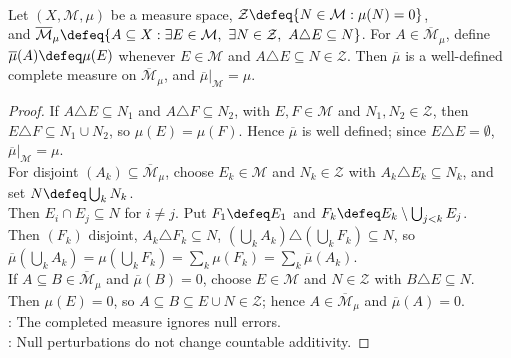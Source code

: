 \begin{proposition} \label{prop:null-ideal-and-measure-completion} \\
Let $(X,\mathcal{M},\mu)$ be a measure space, $\mathcal{Z}\defeq\{N\in\mathcal{M}:\mu(N)=0\}$,\\
and $\overline{\mathcal{M}}_\mu\defeq\{A\subseteq X:\exists E\in\mathcal{M},\ \exists N\in\mathcal{Z},\ A\triangle E\subseteq N\}$. For $A\in\overline{\mathcal{M}}_\mu$, define $\overline{\mu}(A)\defeq\mu(E)$ whenever $E\in\mathcal{M}$ and $A\triangle E\subseteq N\in\mathcal{Z}$. Then $\overline{\mu}$ is a well-defined complete measure on $\overline{\mathcal{M}}_\mu$, and $\overline{\mu}|_{\mathcal{M}}=\mu$.
\begin{proof}
If $A\triangle E\subseteq N_1$ and $A\triangle F\subseteq N_2$, with $E,F\in\mathcal{M}$ and $N_1,N_2\in\mathcal{Z}$, then $E\triangle F\subseteq N_1\cup N_2$, so $\mu(E)=\mu(F)$. Hence $\overline{\mu}$ is well defined; since $E\triangle E=\emptyset$, $\overline{\mu}|_{\mathcal{M}}=\mu$.\\
For disjoint $(A_k)\subseteq\overline{\mathcal{M}}_\mu$, choose $E_k\in\mathcal{M}$ and $N_k\in\mathcal{Z}$ with $A_k\triangle E_k\subseteq N_k$, and set $N\defeq\bigcup_kN_k$.\\
Then $E_i\cap E_j\subseteq N$ for $i\neq j$. Put $F_1\defeq E_1$ and $F_k\defeq E_k\setminus\bigcup_{j<k}E_j$.\\
Then $(F_k)$ disjoint, $A_k\triangle F_k\subseteq N$, $(\bigcup_kA_k)\triangle(\bigcup_kF_k)\subseteq N$, so $\overline{\mu}\left(\bigcup_kA_k\right)=\mu\left(\bigcup_kF_k\right)=\sum_k\mu(F_k)=\sum_k\overline{\mu}(A_k)$.\\
If $A\subseteq B\in\overline{\mathcal{M}}_\mu$ and $\overline{\mu}(B)=0$, choose $E\in\mathcal{M}$ and $N\in\mathcal{Z}$ with $B\triangle E\subseteq N$.\\
Then $\mu(E)=0$, so $A\subseteq B\subseteq E\cup N\in\mathcal{Z}$; hence $A\in\overline{\mathcal{M}}_\mu$ and $\overline{\mu}(A)=0$.\\
: The completed measure ignores null errors.\\
: Null perturbations do not change countable additivity.
\end{proof}
\end{proposition}

